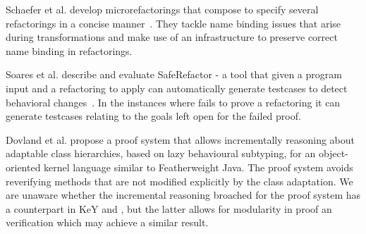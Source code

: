 Schaefer et al. develop microrefactorings that compose to specify several refactorings in a concise manner~\cite{Schafer-OOPSLA-2010}.
They tackle name binding issues that arise during transformations and make use of an infrastructure to preserve correct name binding in refactorings.

Soares et al. describe and evaluate SafeRefactor - a tool that given a program input and a refactoring to apply can automatically generate testcases to detect behavioral changes~\cite{Soares-IEEE-2010}.
In the instances where \Refinity{} fails to prove a refactoring it can generate testcases relating to the goals left open for the failed proof.


Dovland et al. \cite{dovland:adaptableclass2015} propose a proof system that allows
incrementally reasoning about adaptable class hierarchies, based on
lazy behavioural subtyping, for 
an object-oriented kernel language similar to Featherweight Java. The
proof system avoids reverifying methods that are not modified
explicitly by the class adaptation.
We are unaware whether the incremental reasoning broached for the proof system has a counterpart in KeY and \Refinity{}, but
the latter allows for modularity in proof an verification which may achieve a similar result.


